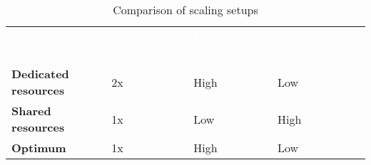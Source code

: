 \begin{table}
	\newcommand\good[1]{\textcolor{hpe-green}{#1}}
	\newcommand\bad[1]{\textcolor{hpe-orange}{#1}}
	\newcommand\heading[1]{\textcolor{white}{\textbf{#1}}}
	\renewcommand{\arraystretch}{1.2}
	\sffamily
	\centering
	\begin{tabularx}{\textwidth}{l l l X}
	\rowcolor{black} \heading{Setup} & \heading{Hardware req.} & \heading{Inference speed} & \heading{Autotuning time} \vspace{2pt} \\
	\textbf{Dedicated resources} & \bad{2x} & \good{High} & \good{Low} \\
	\textbf{Shared resources} & \good{1x} & \bad{Low} & \bad{High} \\
	\textbf{Optimum} & \good{1x} & \good{High} & \good{Low} \\
	\end{tabularx}
	\caption{Comparison of scaling setups}
	\label{tab:tvm-scaling-setups}
\end{table}

